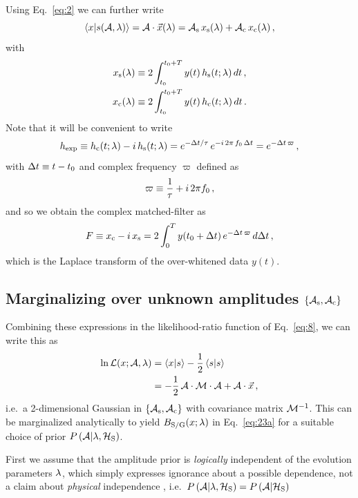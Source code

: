 \documentclass[aps,prd,onecolumn,notitlepage,nofootinbib,superscriptaddress,altaffilletter,floatfix]{revtex4-1}
\begin{document}
Using Eq.~\eqref{eq:2} we can further write
\begin{equation}
  \label{eq:9}
  \left\langle x\middle|s({\mathcal A},\lambda)\right\rangle = {\mathcal A}\cdot\vec{x}(\lambda) = {\mathcal A}_{\mathrm{s}}\,x_{\mathrm{s}}(\lambda) + {\mathcal A}_{\mathrm{c}}\,x_{\mathrm{c}}(\lambda)\,,
\end{equation}
with
\begin{align}
  \label{eq:10}
  x_{\mathrm{s}}(\lambda) &\equiv 2\int_{t_0}^{t_0+T} y(t)\,h_\mathrm{s}(t;\lambda)\,dt\,,\\
  x_{\mathrm{c}}(\lambda) &\equiv 2\int_{t_0}^{t_0+T} y(t)\,h_\mathrm{c}(t;\lambda)\,dt\,.
\end{align}
Note that it will be convenient to write
\begin{equation}
  \label{eq:38}
  h_{\mathrm{exp}} \equiv h_\mathrm{c}(t;\lambda) - i\,h_\mathrm{s}(t;\lambda) = e^{-\Delta t/\tau}\,e^{-i\,2\pi\,f_0\,\Delta t} = e^{-\Delta t \,\varpi}\,,
\end{equation}
with $\Delta t \equiv t - t_0$ and complex frequency $\varpi$ defined as
\begin{equation}
  \label{eq:27}
  \varpi \equiv \frac{1}{\tau} + i\,2\pi f_0\,,
\end{equation}
and so we obtain the complex matched-filter as
\begin{equation}
  \label{eq:16}
  F \equiv x_{\mathrm{c}} - i\,x_{\mathrm{s}} = 2 \int_{0}^{T} y(t_0+\Delta t)\,e^{-\Delta t \,\varpi}\,d\Delta t\,,
\end{equation}
which is the Laplace transform of the over-whitened data $y(t)$.

\subsection{Marginalizing over unknown amplitudes $\{{\mathcal A}_{\mathrm{s}},{\mathcal A}_{\mathrm{c}}\}$}
\label{sec:marg-over-unkn}

Combining these expressions in the likelihood-ratio function of Eq.~\eqref{eq:8}, we can write this as
\begin{align}
  \label{eq:21}
  \ln \mathcal{L}(x;{\mathcal A},\lambda) &= \left\langle x\middle|s\right\rangle - \frac{1}{2}\left\langle s\middle|s\right\rangle\\
  &= -\frac{1}{2}\,{\mathcal A}\cdot\mathcal{M}\cdot{\mathcal A} + {\mathcal A}\cdot\vec{x}\,,
\end{align}
i.e.\ a 2-dimensional Gaussian in $\{{\mathcal A}_{\mathrm{s}},{\mathcal A}_{\mathrm{c}}\}$ with covariance matrix $\mathcal{M}^{-1}$.
This can be marginalized analytically to yield $B_{\mathrm{S/G}}(x;\lambda)$ in Eq.~\eqref{eq:23a} for a suitable choice of prior
$P\left({\mathcal A}\middle|\lambda,\mathcal{H}_{\mathrm{S}}\right)$.

First we assume that the amplitude prior is \emph{logically} independent of the evolution parameters $\lambda$, which simply expresses ignorance about a
possible dependence, not a claim about \emph{physical} independence \cite{jaynes:_logic_of_science},
i.e.\ $P\left({\mathcal A}\middle|\lambda,\mathcal{H}_{\mathrm{S}}\right) = P\left({\mathcal A}\middle|\mathcal{H}_{\mathrm{S}}\right)$
\end{document}
